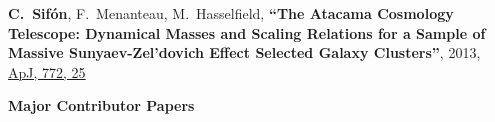 \documentclass{article}
\def\myself{\textbf{\color{red} C.~Sif\'on}}
\def\apj{ApJ}
\newcommand{\paper}[1]{\textbf{``#1''}}
\begin{document}
\begin{etaremune}
\item 
\myself, F.~Menanteau, M.~Hasselfield, 
\paper{The Atacama Cosmology Telescope: Dynamical Masses and Scaling Relations for a Sample of
Massive Sunyaev-Zel'dovich Effect Selected Galaxy Clusters}, 
2013, \href{https://adsabs.harvard.edu/abs/2013ApJ...772...25S}{\apj, 772, 25}

\end{etaremune}




\vspace{0.4cm}
\noindent
{\bf\Large Major Contributor Papers}\\
\end{document}

